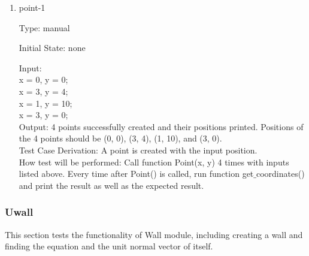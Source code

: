 \documentclass[12pt, titlepage]{article}
\begin{document}
\begin{enumerate}

\item{point-1\\}

Type: manual
					
Initial State: none
					
Input: \\
x = 0, y = 0;\\
x = 3, y = 4;\\
x = 1, y = 10;\\
x = 3, y = 0;\\
					
Output: 4 points successfully created and their positions printed. Positions of the 4 points should be (0, 0), (3, 4), (1, 10), and (3, 0).\\

Test Case Derivation: A point is created with the input position.\\

How test will be performed: Call function Point(x, y) 4 times with inputs listed above.
Every time after Point() is called, run function get$\_$coordinates() and print the result
as well as the expected result.
    
\end{enumerate}

\subsubsection{Uwall}
\label{wall}

This section tests the functionality of Wall module, including creating a wall and finding the equation and the unit normal vector of itself.
\end{document}
